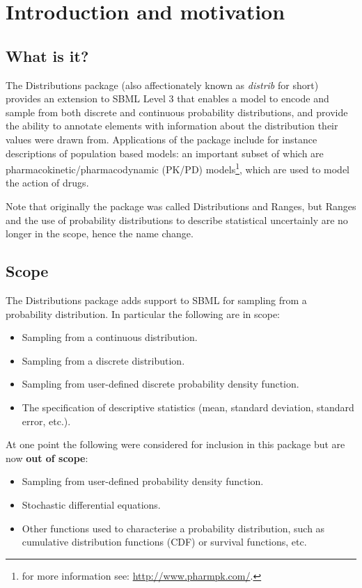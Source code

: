 \documentclass[draftspec]{sbmlpkgspec}
\newcommand{\distribshort}{\emph{distrib}\xspace}
\newcommand{\distrib}{Distributions\xspace}
\begin{document}
\section{Introduction and motivation}

\subsection{What is it?}

The \distrib package (also affectionately known as \distribshort for
short) provides an extension to SBML Level 3 that enables a model to encode and sample from
both discrete and continuous probability distributions, and provide
the ability to annotate elements with information about the distribution their
values were drawn from. 
Applications of the package include for instance descriptions of
population based models: an important subset of which are
pharmacokinetic/pharmacodynamic (PK/PD) models\footnote{for more
  information see: \url{http://www.pharmpk.com/}.}, which are used to
model the action of drugs.

Note that originally the package was called Distributions and Ranges,
but Ranges and the use of probability distributions to describe
statistical uncertainly are no longer in the scope, hence the name change.

\subsection{Scope}

The \distrib package adds support to SBML for sampling from a
probability distribution. In particular the following are in scope:

\begin{itemize}
\item Sampling from a continuous distribution.
\item Sampling from a discrete distribution.
\item Sampling from user-defined discrete probability density function.
\item The specification of descriptive statistics (mean, standard
  deviation, standard error, etc.).
\end{itemize}

At one point the following were considered for inclusion in this
package but are now \textbf{out of scope}:

\begin{itemize}
\item Sampling from user-defined probability density function.
\item Stochastic differential equations.
\item Other functions used to characterise a probability distribution,
  such as cumulative distribution functions (CDF) or survival functions, etc.
\end{itemize}
\end{document}
